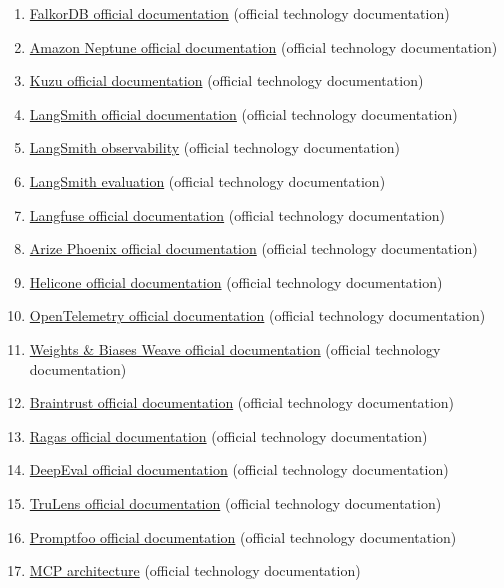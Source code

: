 \begin{enumerate}
\item \href{https://docs.falkordb.com/}{FalkorDB official documentation} (official technology documentation)
\item \href{https://docs.aws.amazon.com/neptune/}{Amazon Neptune official documentation} (official technology documentation)
\item \href{https://docs.kuzudb.com/}{Kuzu official documentation} (official technology documentation)
\item \href{https://docs.langchain.com/langsmith/home}{LangSmith official documentation} (official technology documentation)
\item \href{https://docs.langchain.com/langsmith/observability}{LangSmith observability} (official technology documentation)
\item \href{https://docs.langchain.com/langsmith/evaluation}{LangSmith evaluation} (official technology documentation)
\item \href{https://langfuse.com/docs}{Langfuse official documentation} (official technology documentation)
\item \href{https://arize.com/docs/phoenix}{Arize Phoenix official documentation} (official technology documentation)
\item \href{https://docs.helicone.ai/}{Helicone official documentation} (official technology documentation)
\item \href{https://opentelemetry.io/docs/}{OpenTelemetry official documentation} (official technology documentation)
\item \href{https://weave-docs.wandb.ai/}{Weights \& Biases Weave official documentation} (official technology documentation)
\item \href{https://www.braintrust.dev/docs}{Braintrust official documentation} (official technology documentation)
\item \href{https://docs.ragas.io/}{Ragas official documentation} (official technology documentation)
\item \href{https://deepeval.com/docs/}{DeepEval official documentation} (official technology documentation)
\item \href{https://www.trulens.org/}{TruLens official documentation} (official technology documentation)
\item \href{https://www.promptfoo.dev/docs/}{Promptfoo official documentation} (official technology documentation)
\item \href{https://modelcontextprotocol.io/docs/learn/architecture}{MCP architecture} (official technology documentation)

\end{enumerate}
